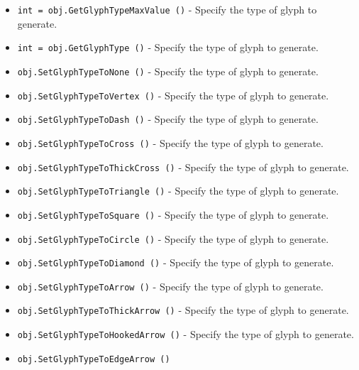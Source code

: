 \begin{itemize}
\item  \verb|int = obj.GetGlyphTypeMaxValue ()| -  Specify the type of glyph to generate.

\item  \verb|int = obj.GetGlyphType ()| -  Specify the type of glyph to generate.

\item  \verb|obj.SetGlyphTypeToNone ()| -  Specify the type of glyph to generate.

\item  \verb|obj.SetGlyphTypeToVertex ()| -  Specify the type of glyph to generate.

\item  \verb|obj.SetGlyphTypeToDash ()| -  Specify the type of glyph to generate.

\item  \verb|obj.SetGlyphTypeToCross ()| -  Specify the type of glyph to generate.

\item  \verb|obj.SetGlyphTypeToThickCross ()| -  Specify the type of glyph to generate.

\item  \verb|obj.SetGlyphTypeToTriangle ()| -  Specify the type of glyph to generate.

\item  \verb|obj.SetGlyphTypeToSquare ()| -  Specify the type of glyph to generate.

\item  \verb|obj.SetGlyphTypeToCircle ()| -  Specify the type of glyph to generate.

\item  \verb|obj.SetGlyphTypeToDiamond ()| -  Specify the type of glyph to generate.

\item  \verb|obj.SetGlyphTypeToArrow ()| -  Specify the type of glyph to generate.

\item  \verb|obj.SetGlyphTypeToThickArrow ()| -  Specify the type of glyph to generate.

\item  \verb|obj.SetGlyphTypeToHookedArrow ()| -  Specify the type of glyph to generate.

\item  \verb|obj.SetGlyphTypeToEdgeArrow ()|

\end{itemize}
